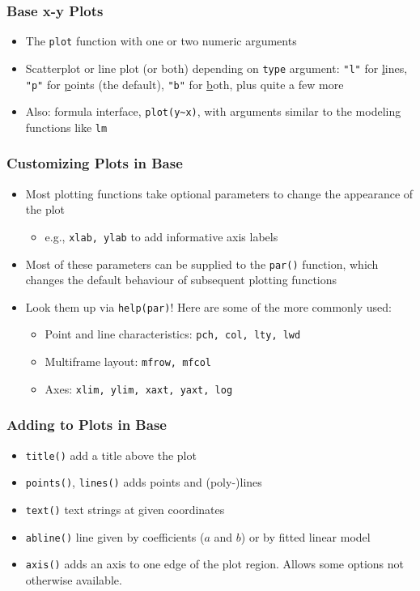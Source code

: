 \documentclass[xcolor=svgnames]{beamer}
\newcommand{\code}[1]{\texttt{#1}}
\begin{document}
\begin{frame}
  \frametitle{Base x-y Plots}
  \begin{itemize}
  \item The \code{plot} function with one or two numeric arguments
  \item Scatterplot or line plot (or both) depending on \code{type}
    argument: \code{"l"} for \underline{l}ines, \code{"p"} for
    \underline{p}oints (the default), \code{"b"} for \underline{b}oth, plus
    quite a few more
  \item Also: formula interface, \code{plot(y\textasciitilde x)}, with
    arguments similar to the modeling functions like \code{lm}
  \end{itemize}
\end{frame}

\begin{frame}
  \frametitle{Customizing Plots in Base}
  \begin{itemize}
  \item Most plotting functions take optional parameters to change the
    appearance of the plot
    \begin{itemize}
    \item e.g., \code{xlab, ylab} to add informative axis labels
    \end{itemize}
  \item Most of these parameters can be supplied to the \code{par()}
    function, which changes the default behaviour of subsequent
    plotting functions
  \item Look them up via \code{help(par)}! Here are some of the more
    commonly used:
    \begin{itemize}
    \item Point and line characteristics: \code{pch, col, lty, lwd}
    \item Multiframe layout: \code{mfrow, mfcol}
    \item Axes: \code{xlim, ylim, xaxt, yaxt, log}
    \end{itemize}
  \end{itemize}
\end{frame}

\begin{frame}
  \frametitle{Adding to Plots in Base}
    \begin{itemize}
    \item \code{title()} add a title above the plot
    \item \code{points()}, \code{lines()} adds points and (poly-)lines
    \item \code{text()} text strings at given coordinates
    \item \code{abline()} line given by coefficients ($a$ and $b$) or
      by fitted linear model
    \item \code{axis()} adds an axis to one edge of the plot region.
      Allows some options not otherwise available.
    \end{itemize}
\end{frame}
\end{document}
